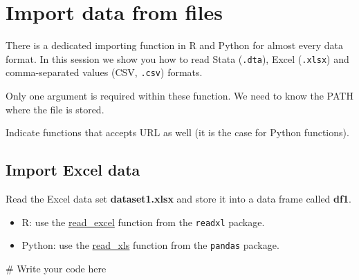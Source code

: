 \documentclass[
  letterpaper,
  DIV=11,
  numbers=noendperiod]{scrartcl}
\newenvironment{Shaded}{\begin{snugshade}}{\end{snugshade}}
\newcommand{\CommentTok}[1]{\textcolor[rgb]{0.37,0.37,0.37}{#1}}
\providecommand{\tightlist}{%
  \setlength{\itemsep}{0pt}\setlength{\parskip}{0pt}}\usepackage{longtable,booktabs,array}
\begin{document}
\hypertarget{import-data-from-files}{%
\section{Import data from files}\label{import-data-from-files}}

There is a dedicated importing function in R and Python for almost every
data format. In this session we show you how to read Stata
(\texttt{.dta}), Excel (\texttt{.xlsx}) and comma-separated values (CSV,
\texttt{.csv}) formats.

Only one argument is required within these function. We need to know the
PATH where the file is stored.

Indicate functions that accepts URL as well (it is the case for Python
functions).

\hypertarget{import-excel-data}{%
\subsection{Import Excel data}\label{import-excel-data}}

Read the Excel data set \textbf{dataset1.xlsx} and store it into a data
frame called \textbf{df1}.

\begin{tcolorbox}[enhanced jigsaw, arc=.35mm, coltitle=black, toprule=.15mm, bottomtitle=1mm, colbacktitle=quarto-callout-tip-color!10!white, bottomrule=.15mm, titlerule=0mm, rightrule=.15mm, colframe=quarto-callout-tip-color-frame, title=\textcolor{quarto-callout-tip-color}{\faLightbulb}\hspace{0.5em}{Tip}, breakable, opacityback=0, opacitybacktitle=0.6, toptitle=1mm, leftrule=.75mm, colback=white, left=2mm]

\begin{itemize}
\tightlist
\item
  R: use the
  \href{https://readxl.tidyverse.org/reference/read_excel.html}{read\_excel}
  function from the \texttt{readxl} package.
\item
  Python: use the
  \href{https://pandas.pydata.org/docs/reference/api/pandas.read_excel.html}{read\_xls}
  function from the \texttt{pandas} package.
\end{itemize}

\end{tcolorbox}

\begin{Shaded}
\begin{Highlighting}[]
\CommentTok{\# Write your code here}
\end{Highlighting}
\end{Shaded}
\end{document}
